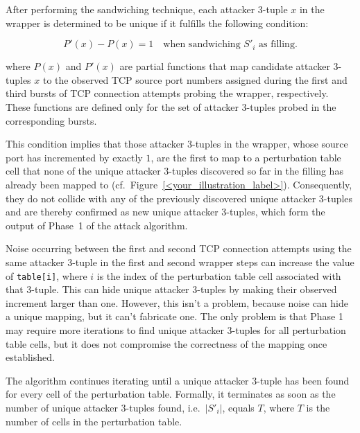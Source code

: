 \documentclass[twocolumn]{report}
\begin{document}
After performing the sandwiching technique, each attacker 3-tuple \( x \) in the wrapper is determined to be \alert{unique} if it fulfills the following \alert{condition}:

\vspace{-0.2cm}
\begin{minipage}{\columnwidth}
	\begin{equation*}
		P'(x) - P(x) = 1
		\quad \text{when sandwiching } S'_i \text{ as filling.}
	\end{equation*}
\end{minipage}

where \(P(x)\) and \(P'(x)\) are partial functions that map \alert{candidate attacker 3-tuples \( x \) to} the observed \alert{TCP source port} numbers assigned during the first and third bursts of TCP connection attempts probing the wrapper, respectively. These functions are defined only for the set of attacker 3-tuples probed in the corresponding bursts.

This \alert{condition implies} that those attacker 3-tuples in the wrapper, whose source port has incremented by exactly $1$, are the first to map to a perturbation table cell that none of the unique attacker 3-tuples discovered so far in the filling has already been mapped to (cf.\ Figure~\ref{<your_illustration_label>}). Consequently, they do not collide with any of the previously discovered unique attacker 3-tuples and are thereby confirmed as new \alert{unique attacker 3-tuples}, which form the \alert{output} of Phase~1 of the attack algorithm.

\alert{Noise} occurring between the first and second TCP connection attempts using the same attacker 3-tuple in the first and second wrapper steps can increase the value of \texttt{table[i]}, where $i$ is the index of the perturbation table cell associated with that 3-tuple. This \alert{can hide} unique attacker 3-tuples by making their observed increment larger than one. However, this isn’t a problem, because noise can hide a unique mapping, but it \alert{can’t fabricate} one. The only problem is that Phase 1 may require more iterations to find unique attacker 3-tuples for all perturbation table cells, but it does not compromise the correctness of the mapping once established.

The algorithm continues iterating until a unique attacker 3-tuple has been found for every cell of the perturbation table. Formally, it \alert{terminates} as soon as the number of unique attacker 3-tuples found, i.e.\ $\lvert S'_i \rvert$, equals $T$, where $T$ is the number of cells in the perturbation table.
\end{document}
